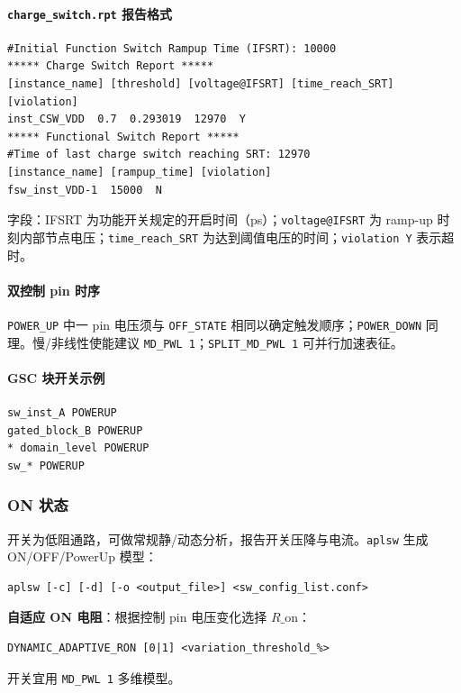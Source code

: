 \paragraph{\texttt{charge\_switch.rpt} 报告格式}
\begin{lstlisting}
#Initial Function Switch Rampup Time (IFSRT): 10000
***** Charge Switch Report *****
[instance_name] [threshold] [voltage@IFSRT] [time_reach_SRT] [violation]
inst_CSW_VDD  0.7  0.293019  12970  Y
***** Functional Switch Report *****
#Time of last charge switch reaching SRT: 12970
[instance_name] [rampup_time] [violation]
fsw_inst_VDD-1  15000  N
\end{lstlisting}
字段：IFSRT 为功能开关规定的开启时间（ps）；\texttt{voltage@IFSRT} 为 ramp-up 时刻内部节点电压；\texttt{time\_reach\_SRT} 为达到阈值电压的时间；\texttt{violation Y} 表示超时。

\paragraph{双控制 pin 时序}
\texttt{POWER\_UP} 中一 pin 电压须与 \texttt{OFF\_STATE} 相同以确定触发顺序；\texttt{POWER\_DOWN} 同理。慢/非线性使能建议 \texttt{MD\_PWL 1}；\texttt{SPLIT\_MD\_PWL 1} 可并行加速表征。

\paragraph{GSC 块开关示例}
\begin{lstlisting}
sw_inst_A POWERUP
gated_block_B POWERUP
* domain_level POWERUP
sw_* POWERUP
\end{lstlisting}




\subsubsection{ON 状态}
开关为低阻通路，可做常规静/动态分析，报告开关压降与电流。\texttt{aplsw} 生成 ON/OFF/PowerUp 模型：
\begin{lstlisting}
aplsw [-c] [-d] [-o <output_file>] <sw_config_list.conf>
\end{lstlisting}


\textbf{自适应 ON 电阻}：根据控制 pin 电压变化选择 $R\_{\mathrm{on}}$：
\begin{lstlisting}
DYNAMIC_ADAPTIVE_RON [0|1] <variation_threshold_%>
\end{lstlisting}
开关宜用 \texttt{MD\_PWL 1} 多维模型。

